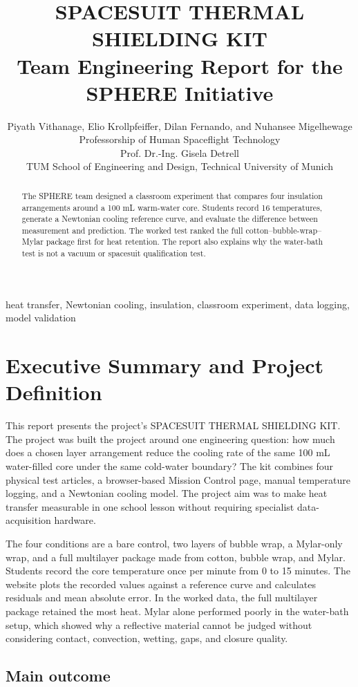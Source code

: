 \documentclass[10pt,conference,a4paper]{IEEEtran}
\title{SPACESUIT THERMAL SHIELDING KIT\\\large Team Engineering Report for the SPHERE Initiative}
\author{Piyath Vithanage, Elio Krollpfeiffer, Dilan Fernando, and Nuhansee Migelhewage\\
Professorship of Human Spaceflight Technology\\Prof. Dr.-Ing. Gisela Detrell\\
TUM School of Engineering and Design, Technical University of Munich}
\begin{document}
\maketitle
\begin{abstract}
The SPHERE team designed a classroom experiment that compares four insulation arrangements around a 100 mL warm-water core. Students record 16 temperatures, generate a Newtonian cooling reference curve, and evaluate the difference between measurement and prediction. The worked test ranked the full cotton--bubble-wrap--Mylar package first for heat retention. The report also explains why the water-bath test is not a vacuum or spacesuit qualification test.
\end{abstract}
\begin{IEEEkeywords}
heat transfer, Newtonian cooling, insulation, classroom experiment, data logging, model validation
\end{IEEEkeywords}


\section*{Executive Summary and Project Definition}

This report presents the project's SPACESUIT THERMAL SHIELDING KIT. The project was built the project around one engineering question: how much does a chosen layer arrangement reduce the cooling rate of the same 100 mL water-filled core under the same cold-water boundary? The kit combines four physical test articles, a browser-based Mission Control page, manual temperature logging, and a Newtonian cooling model. The project aim was to make heat transfer measurable in one school lesson without requiring specialist data-acquisition hardware.

The four conditions are a bare control, two layers of bubble wrap, a Mylar-only wrap, and a full multilayer package made from cotton, bubble wrap, and Mylar. Students record the core temperature once per minute from 0 to 15 minutes. The website plots the recorded values against a reference curve and calculates residuals and mean absolute error. In the worked data, the full multilayer package retained the most heat. Mylar alone performed poorly in the water-bath setup, which showed why a reflective material cannot be judged without considering contact, convection, wetting, gaps, and closure quality.

\subsection*{Main outcome}
\end{document}
